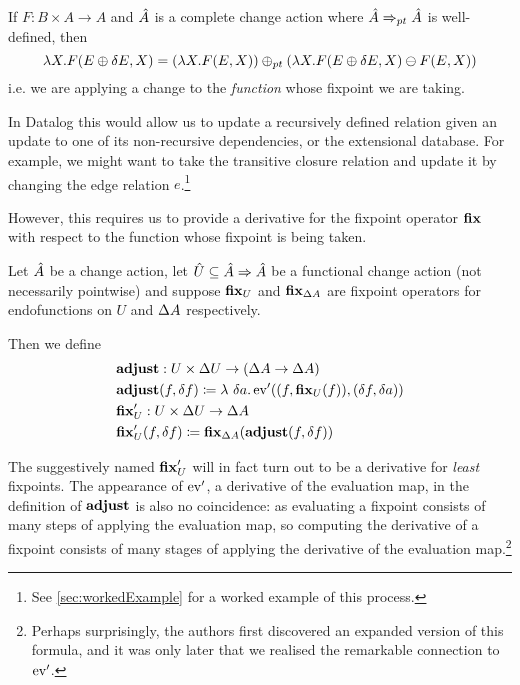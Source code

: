 If $F : B \times A \rightarrow A$ and $\hat{A}$ is a complete change action where
$\hat{A} \Rightarrow_{pt} \hat{A}$ is well-defined, then 
\begin{displaymath}
  \lambda X . F(E \oplus \delta E, X) = (\lambda X . F(E, X)) \oplus_{pt}
  (\lambda X . F(E \oplus \delta E, X) \ominus F(E, X))
\end{displaymath}
i.e. we are applying a change to the \emph{function} whose fixpoint we are taking.

In Datalog this would allow us to update a recursively defined relation given an
update to one of its non-recursive dependencies, or the extensional database.
For example, we might want to take the transitive closure relation
and update it by changing the edge relation $e$.\footnote{See
  \cref{sec:workedExample} for a worked example of this process.}

However, this requires us to provide a derivative for the fixpoint operator
$\mathbf{fix}$ with respect to the function whose fixpoint is being taken.

\begin{defn}
\label{def:fixpointDerivatives}
  Let $\hat{A}$ be a change action, let $\hat{U} \subseteq \hat{A} \Rightarrow \hat{A}$ be a functional
  change action (not necessarily pointwise) and suppose $\mathbf{fix}_U$ and $\mathbf{fix}_{\Delta A}$ are fixpoint
  operators for endofunctions on $U$ and $\Delta A$ respectively.
  
  Then we define
  \begin{align*}
    &\mathbf{adjust} : U \times \Delta U \rightarrow (\Delta A \rightarrow \Delta A)\\
    &\mathbf{adjust}(f, \delta f) \coloneqq \lambda\ \delta a . \operatorname{ev}'((f, \mathbf{fix}_U(f)), (\delta f, \delta a))\\
    &\mathbf{fix}_U' : U \times \Delta U \rightarrow \Delta A\\
    &\mathbf{fix}_U'(f, \delta f) \coloneqq \mathbf{fix}_{\Delta A}(\mathbf{adjust}(f, \delta f))
  \end{align*}
\end{defn}

The suggestively named $\mathbf{fix}_U'$ will in fact turn out to be a
derivative \textemdash{} for \emph{least} fixpoints. The appearance of
$\operatorname{ev}'$, a derivative of the evaluation map, in the definition of
$\mathbf{adjust}$ is also no coincidence: as evaluating a fixpoint consists of many
steps of applying the evaluation map, so computing the derivative of a fixpoint
consists of many stages of applying the derivative of the evaluation
map.\footnote{Perhaps surprisingly, the authors first discovered an expanded
  version of this formula, and it was only later that we realised the remarkable
  connection to $\operatorname{ev}'$.}

